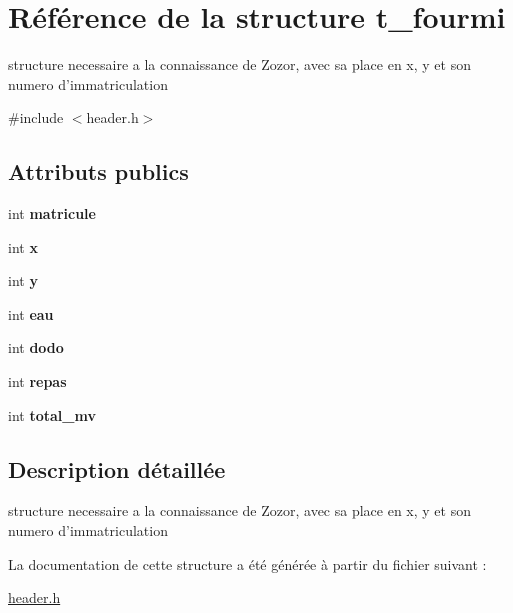 \hypertarget{structt__fourmi}{\section{Référence de la structure t\+\_\+fourmi}
\label{structt__fourmi}
}


structure necessaire a la connaissance de Zozor, avec sa place en x, y et son numero d'immatriculation  




{\ttfamily \#include $<$header.\+h$>$}

\subsection*{Attributs publics}
\begin{DoxyCompactItemize}
\item 
\hypertarget{structt__fourmi_ab45e723a7a11d7789888a5ee574c6bc9}{int {\bfseries matricule}}\label{structt__fourmi_ab45e723a7a11d7789888a5ee574c6bc9}

\item 
\hypertarget{structt__fourmi_a258cf4f2243aad27ab01dc55bb701078}{int {\bfseries x}}\label{structt__fourmi_a258cf4f2243aad27ab01dc55bb701078}

\item 
\hypertarget{structt__fourmi_aa9fe73b8d3d492ce6cf3985e4910fdf2}{int {\bfseries y}}\label{structt__fourmi_aa9fe73b8d3d492ce6cf3985e4910fdf2}

\item 
\hypertarget{structt__fourmi_a757c3ee4ea2dcbf825cd93f6b8bf0ef8}{int {\bfseries eau}}\label{structt__fourmi_a757c3ee4ea2dcbf825cd93f6b8bf0ef8}

\item 
\hypertarget{structt__fourmi_a0a2a75c5a649f263d4e299a488edfe4f}{int {\bfseries dodo}}\label{structt__fourmi_a0a2a75c5a649f263d4e299a488edfe4f}

\item 
\hypertarget{structt__fourmi_a5ba7caca7f8cf1e8195ceae92cdaca00}{int {\bfseries repas}}\label{structt__fourmi_a5ba7caca7f8cf1e8195ceae92cdaca00}

\item 
\hypertarget{structt__fourmi_a81345593813fffd4760b20bc55392190}{int {\bfseries total\+\_\+mv}}\label{structt__fourmi_a81345593813fffd4760b20bc55392190}

\end{DoxyCompactItemize}


\subsection{Description détaillée}
structure necessaire a la connaissance de Zozor, avec sa place en x, y et son numero d'immatriculation 

La documentation de cette structure a été générée à partir du fichier suivant \+:\begin{DoxyCompactItemize}
\item 
\hyperlink{header_8h}{header.\+h}\end{DoxyCompactItemize}
